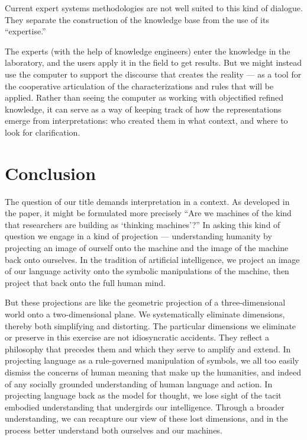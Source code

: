 \documentclass[12pt]{article}
\begin{document}
Current expert systems methodologies are not well suited to this kind of dialogue. They separate the construction of the knowledge base from the use of its ``expertise.''

The experts (with the help of knowledge engineers) enter the knowledge in the laboratory, and the users apply it in the field to get results. But we might instead use the computer to support the discourse that creates the reality --- as a tool for the cooperative articulation of the characterizations and rules that will be applied. Rather than seeing the computer as working with objectified refined knowledge, it can serve as a way of keeping track of how the representations emerge from interpretations: who created them in what context, and where to look for clarification.

\section{Conclusion}

The question of our title demands interpretation in a context. As developed in the paper, it might be formulated more precisely ``Are we machines of the kind that researchers are building as `thinking machines'?'' In asking this kind of question we engage in a kind of projection --- understanding humanity by projecting an image of ourself onto the machine and the image of the machine back onto ourselves. In the tradition of artificial intelligence, we project an image of our language activity onto the symbolic manipulations of the machine, then project that back onto the full human mind.

But these projections are like the geometric projection of a three-dimensional world onto a two-dimensional plane. We systematically eliminate dimensions, thereby both simplifying and distorting. The particular dimensions we eliminate or preserve in this exercise are not idiosyncratic accidents. They reflect a philosophy that precedes them and which they serve to amplify and extend. In projecting language as a rule-governed manipulation of symbols, we all too easily dismiss the concerns of human meaning that make up the humanities, and indeed of any socially grounded understanding of human language and action. In projecting language back as the model for thought, we lose sight of the tacit embodied understanding that undergirds our intelligence. Through a broader understanding, we can recapture our view of these lost dimensions, and in the process better understand both ourselves and our machines.

\bigskip
\noindent

\printbibliography
\end{document}
